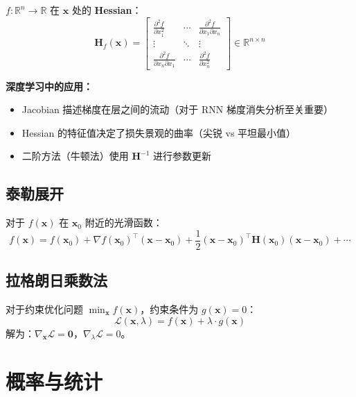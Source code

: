 $f: \mathbb{R}^n \to \mathbb{R}$ 在 $\mathbf{x}$ 处的 \textbf{Hessian}：
\begin{equation}
\mathbf{H}_f(\mathbf{x}) = \begin{bmatrix}
\frac{\partial^2 f}{\partial x_1^2} & \cdots & \frac{\partial^2 f}{\partial x_1 \partial x_n} \\
\vdots & \ddots & \vdots \\
\frac{\partial^2 f}{\partial x_n \partial x_1} & \cdots & \frac{\partial^2 f}{\partial x_n^2}
\end{bmatrix} \in \mathbb{R}^{n \times n}
\end{equation}

\textbf{深度学习中的应用：}
\begin{itemize}
    \item Jacobian 描述梯度在层之间的流动（对于 RNN 梯度消失分析至关重要）
    \item Hessian 的特征值决定了损失景观的曲率（尖锐 vs 平坦最小值）
    \item 二阶方法（牛顿法）使用 $\mathbf{H}^{-1}$ 进行参数更新
\end{itemize}

\subsection{泰勒展开}

对于 $f(\mathbf{x})$ 在 $\mathbf{x}_0$ 附近的光滑函数：
\begin{equation}
f(\mathbf{x}) = f(\mathbf{x}_0) + \nabla f(\mathbf{x}_0)^\top(\mathbf{x} - \mathbf{x}_0) + \frac{1}{2}(\mathbf{x} - \mathbf{x}_0)^\top \mathbf{H}(\mathbf{x}_0)(\mathbf{x} - \mathbf{x}_0) + \cdots
\end{equation}

\subsection{拉格朗日乘数法}

对于约束优化问题 $\min_{\mathbf{x}} f(\mathbf{x})$，约束条件为 $g(\mathbf{x}) = 0$：
\begin{equation}
\mathcal{L}(\mathbf{x}, \lambda) = f(\mathbf{x}) + \lambda \cdot g(\mathbf{x})
\end{equation}
解为：$\nabla_\mathbf{x} \mathcal{L} = \mathbf{0}$，$\nabla_\lambda \mathcal{L} = 0$。

\section{概率与统计}

